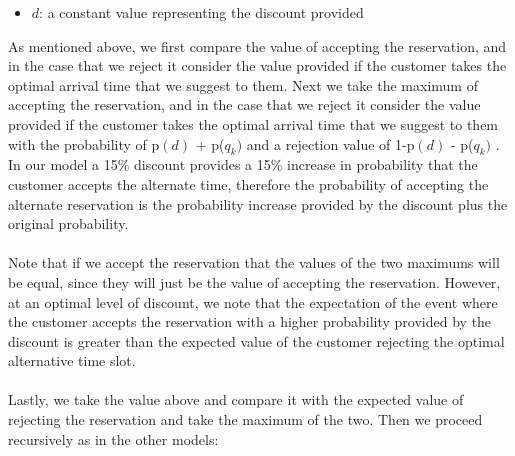 \documentclass[12pt, titlepage]{article}
\begin{document}
\begin{itemize}
\item $d$: a constant value representing the discount provided 
\end{itemize}

As mentioned above, we first compare the value of accepting the reservation, and in the case that we reject it consider the value provided if the customer takes the optimal arrival time that we suggest to them. Next we take the maximum of accepting the reservation, and in the case that we reject it consider the value provided if the customer takes the optimal arrival time that we suggest to them with the probability of p$(d)$ + p($q_{k})$ and a rejection value of 1-p$(d)$ - p($q_{k})$ . In our model a 15$\%$ discount provides a 15$\%$  increase in probability that the customer accepts the alternate time, therefore the probability of accepting the alternate reservation is the probability increase provided by the discount plus the original probability.\\
\\
Note that if we accept the reservation that the values of the two maximums will be equal, since they will just be the value of accepting the reservation. However, at an optimal level of discount, we note that the expectation of the event where the customer accepts the reservation with a higher probability provided by the discount is greater than the expected value of the customer rejecting the optimal alternative time slot.\\ 
\\
Lastly, we take the value above and compare it with the expected value of rejecting the reservation and take the maximum of the two. Then we proceed recursively as in the other models:
\end{document}
